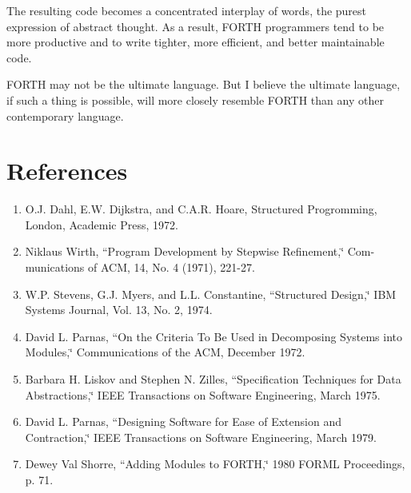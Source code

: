 The resulting code becomes a concentrated interplay of words, the
purest expression of abstract thought. As a result, FORTH programmers
tend to be more productive and to write tighter, more efficient, and
better maintainable code.

FORTH may not be the ultimate language. But I believe the ultimate
language, if such a thing is possible, will more closely resemble
FORTH than any other contemporary language.


\section*{References}

\begin{enumerate}
\item O.J. Dahl, E.W. Dijkstra, and C.A.R. Hoare, Structured Progromming,
London, Academic Press, 1972.
\item Niklaus Wirth, {}``Program Development by Stepwise Refinement,\char`\"{}
Com- munications of ACM, 14, No. 4 (1971), 221-27.
\item W.P. Stevens, G.J. Myers, and L.L. Constantine, {}``Structured Design,\char`\"{}
IBM Systems Journal, Vol. 13, No. 2, 1974.
\item David L. Parnas, {}``On the Criteria To Be Used in Decomposing Systems
into Modules,\char`\"{} Communications of the ACM, December 1972.
\item Barbara H. Liskov and Stephen N. Zilles, {}``Specification Techniques
for Data Abstractions,\char`\"{} IEEE Transactions on Software Engineering,
March 1975.
\item David L. Parnas, {}``Designing Software for Ease of Extension and
Contraction,\char`\"{} IEEE Transactions on Software Engineering,
March 1979.
\item Dewey Val Shorre, {}``Adding Modules to FORTH,\char`\"{} 1980 FORML
Proceedings, p. 71.\end{enumerate}
